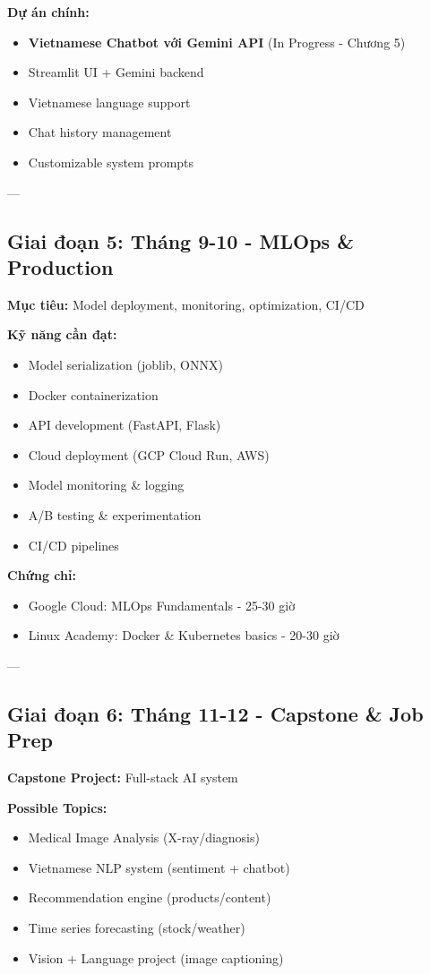 \documentclass[12pt,a4paper]{article}
\begin{document}
\textbf{Dự án chính:}
\begin{itemize}
    \item \textbf{Vietnamese Chatbot với Gemini API} (In Progress - Chương 5)
    \item Streamlit UI + Gemini backend
    \item Vietnamese language support
    \item Chat history management
    \item Customizable system prompts
\end{itemize}

---

\subsection{Giai đoạn 5: Tháng 9-10 - MLOps \& Production}

\textbf{Mục tiêu:} Model deployment, monitoring, optimization, CI/CD

\textbf{Kỹ năng cần đạt:}
\begin{itemize}
    \item Model serialization (joblib, ONNX)
    \item Docker containerization
    \item API development (FastAPI, Flask)
    \item Cloud deployment (GCP Cloud Run, AWS)
    \item Model monitoring \& logging
    \item A/B testing \& experimentation
    \item CI/CD pipelines
\end{itemize}

\textbf{Chứng chỉ:}
\begin{itemize}
    \item Google Cloud: MLOps Fundamentals - 25-30 giờ
    \item Linux Academy: Docker \& Kubernetes basics - 20-30 giờ
\end{itemize}

---

\subsection{Giai đoạn 6: Tháng 11-12 - Capstone \& Job Prep}

\textbf{Capstone Project:} Full-stack AI system

\textbf{Possible Topics:}
\begin{itemize}
    \item Medical Image Analysis (X-ray/diagnosis)
    \item Vietnamese NLP system (sentiment + chatbot)
    \item Recommendation engine (products/content)
    \item Time series forecasting (stock/weather)
    \item Vision + Language project (image captioning)
\end{itemize}
\end{document}
